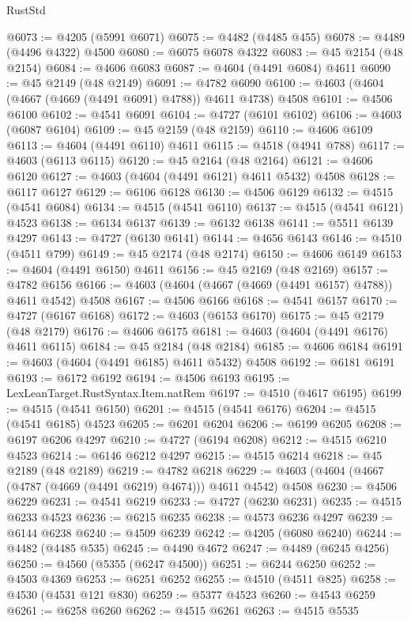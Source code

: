 \begin{lexlean}{RustStd}
\begin{coremodule}
@6073 := @4205 (@5991 @6071)
@6075 := @4482 (@4485 @455)
@6078 := @4489 (@4496 @4322) @4500
@6080 := @6075 @6078 @4322
@6083 := @45 @2154 (@48 @2154)
@6084 := @4606 @6083
@6087 := @4604 (@4491 @6084) @4611
@6090 := @45 @2149 (@48 @2149)
@6091 := @4782 @6090
@6100 := @4603 (@4604 (@4667 (@4669 (@4491 @6091) @4788)) @4611 @4738) @4508
@6101 := @4506 @6100
@6102 := @4541 @6091
@6104 := @4727 (@6101 @6102)
@6106 := @4603 (@6087 @6104)
@6109 := @45 @2159 (@48 @2159)
@6110 := @4606 @6109
@6113 := @4604 (@4491 @6110) @4611
@6115 := @4518 (@4941 @788)
@6117 := @4603 (@6113 @6115)
@6120 := @45 @2164 (@48 @2164)
@6121 := @4606 @6120
@6127 := @4603 (@4604 (@4491 @6121) @4611 @5432) @4508
@6128 := @6117 @6127
@6129 := @6106 @6128
@6130 := @4506 @6129
@6132 := @4515 (@4541 @6084)
@6134 := @4515 (@4541 @6110)
@6137 := @4515 (@4541 @6121) @4523
@6138 := @6134 @6137
@6139 := @6132 @6138
@6141 := @5511 @6139 @4297
@6143 := @4727 (@6130 @6141)
@6144 := @4656 @6143
@6146 := @4510 (@4511 @799)
@6149 := @45 @2174 (@48 @2174)
@6150 := @4606 @6149
@6153 := @4604 (@4491 @6150) @4611
@6156 := @45 @2169 (@48 @2169)
@6157 := @4782 @6156
@6166 := @4603 (@4604 (@4667 (@4669 (@4491 @6157) @4788)) @4611 @4542) @4508
@6167 := @4506 @6166
@6168 := @4541 @6157
@6170 := @4727 (@6167 @6168)
@6172 := @4603 (@6153 @6170)
@6175 := @45 @2179 (@48 @2179)
@6176 := @4606 @6175
@6181 := @4603 (@4604 (@4491 @6176) @4611 @6115)
@6184 := @45 @2184 (@48 @2184)
@6185 := @4606 @6184
@6191 := @4603 (@4604 (@4491 @6185) @4611 @5432) @4508
@6192 := @6181 @6191
@6193 := @6172 @6192
@6194 := @4506 @6193
@6195 := LexLeanTarget.RustSyntax.Item.natRem
@6197 := @4510 (@4617 @6195)
@6199 := @4515 (@4541 @6150)
@6201 := @4515 (@4541 @6176)
@6204 := @4515 (@4541 @6185) @4523
@6205 := @6201 @6204
@6206 := @6199 @6205
@6208 := @6197 @6206 @4297
@6210 := @4727 (@6194 @6208)
@6212 := @4515 @6210 @4523
@6214 := @6146 @6212 @4297
@6215 := @4515 @6214
@6218 := @45 @2189 (@48 @2189)
@6219 := @4782 @6218
@6229 := @4603 (@4604 (@4667 (@4787 (@4669 (@4491 @6219) @4674))) @4611 @4542) @4508
@6230 := @4506 @6229
@6231 := @4541 @6219
@6233 := @4727 (@6230 @6231)
@6235 := @4515 @6233 @4523
@6236 := @6215 @6235
@6238 := @4573 @6236 @4297
@6239 := @6144 @6238
@6240 := @4509 @6239
@6242 := @4205 (@6080 @6240)
@6244 := @4482 (@4485 @535)
@6245 := @4490 @4672
@6247 := @4489 (@6245 @4256)
@6250 := @4560 (@5355 (@6247 @4500))
@6251 := @6244 @6250
@6252 := @4503 @4369
@6253 := @6251 @6252
@6255 := @4510 (@4511 @825)
@6258 := @4530 (@4531 @121 @830)
@6259 := @5377 @4523
@6260 := @4543 @6259
@6261 := @6258 @6260
@6262 := @4515 @6261
@6263 := @4515 @5535

\end{coremodule}
\end{lexlean}
